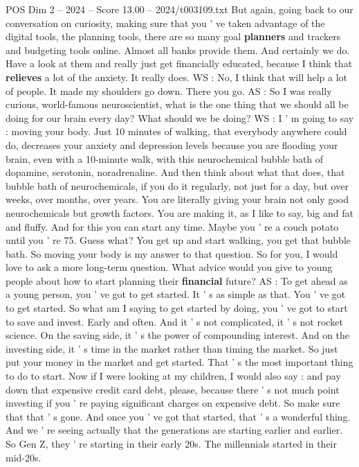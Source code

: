\begin{textsample}{POS Dim 2 – 2024 – Score 13.00 – 2024/t003109.txt}
But again, going back to our conversation on curiosity, making sure that you ' ve taken advantage of the digital tools, the planning tools, there are so many goal \textbf{planners} and trackers and budgeting tools online.
Almost all banks provide them.
And certainly we do.
Have a look at them and really just get financially educated, because I think that \textbf{relieves} a lot of the anxiety.
It really does.
WS : No, I think that will help a lot of people.
It made my shoulders go down.
There you go.
AS : So I was really curious, world-famous neuroscientist, what is the one thing that we should all be doing for our brain every day?
What should we be doing?
WS : I ' m going to say : moving your body.
Just 10 minutes of walking, that everybody anywhere could do, decreases your anxiety and depression levels because you are flooding your brain, even with a 10-minute walk, with this neurochemical bubble bath of dopamine, serotonin, noradrenaline.
And then think about what that does, that bubble bath of neurochemicals, if you do it regularly, not just for a day, but over weeks, over months, over years.
You are literally giving your brain not only good neurochemicals but growth factors.
You are making it, as I like to say, big and fat and fluffy.
And for this you can start any time.
Maybe you ' re a couch potato until you ' re 75.
Guess what?
You get up and start walking, you get that bubble bath.
So moving your body is my answer to that question.
So for you, I would love to ask a more long-term question.
What advice would you give to young people about how to start planning their \textbf{financial} future?
AS : To get ahead as a young person, you ' ve got to get started.
It ' s as simple as that.
You ' ve got to get started.
So what am I saying to get started by doing, you ' ve got to start to save and invest.
Early and often.
And it ' s not complicated, it ' s not rocket science.
On the saving side, it ' s the power of compounding interest.
And on the investing side, it ' s time in the market rather than timing the market.
So just put your money in the market and get started.
That ' s the most important thing to do to start.
Now if I were looking at my children, I would also say : and pay down that expensive credit card debt, please, because there ' s not much point investing if you ' re paying significant charges on expensive debt.
So make sure that that ' s gone.
And once you ' ve got that started, that ' s a wonderful thing.
And we ' re seeing actually that the generations are starting earlier and earlier.
So Gen Z, they ' re starting in their early 20s.
The millennials started in their mid-20s.

\end{textsample}
